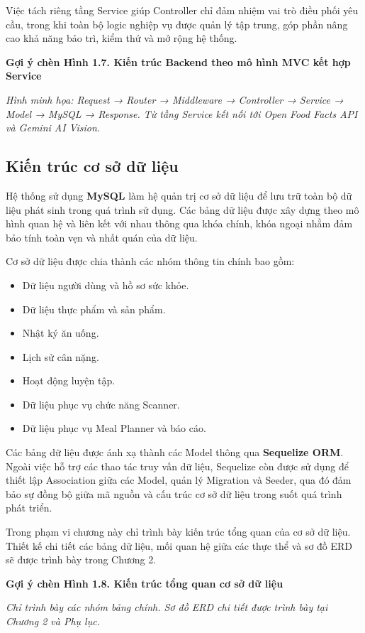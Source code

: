 \documentclass[12pt, a4paper]{report}
\begin{document}
Việc tách riêng tầng Service giúp Controller chỉ đảm nhiệm vai trò điều phối yêu cầu, trong khi toàn bộ logic nghiệp vụ được quản lý tập trung, góp phần nâng cao khả năng bảo trì, kiểm thử và mở rộng hệ thống.

\textbf{Gợi ý chèn Hình 1.7. Kiến trúc Backend theo mô hình MVC kết hợp Service}

\textit{Hình minh họa: Request → Router → Middleware → Controller → Service → Model → MySQL → Response. Từ tầng Service kết nối tới Open Food Facts API và Gemini AI Vision.}

\subsection{Kiến trúc cơ sở dữ liệu}Hệ thống sử dụng \textbf{MySQL} làm hệ quản trị cơ sở dữ liệu để lưu trữ toàn bộ dữ liệu phát sinh trong quá trình sử dụng. Các bảng dữ liệu được xây dựng theo mô hình quan hệ và liên kết với nhau thông qua khóa chính, khóa ngoại nhằm đảm bảo tính toàn vẹn và nhất quán của dữ liệu.

Cơ sở dữ liệu được chia thành các nhóm thông tin chính bao gồm:

\begin{itemize}
\item Dữ liệu người dùng và hồ sơ sức khỏe.
\item Dữ liệu thực phẩm và sản phẩm.
\item Nhật ký ăn uống.
\item Lịch sử cân nặng.
\item Hoạt động luyện tập.
\item Dữ liệu phục vụ chức năng Scanner.
\item Dữ liệu phục vụ Meal Planner và báo cáo.
\end{itemize}
Các bảng dữ liệu được ánh xạ thành các Model thông qua \textbf{Sequelize ORM}. Ngoài việc hỗ trợ các thao tác truy vấn dữ liệu, Sequelize còn được sử dụng để thiết lập Association giữa các Model, quản lý Migration và Seeder, qua đó đảm bảo sự đồng bộ giữa mã nguồn và cấu trúc cơ sở dữ liệu trong suốt quá trình phát triển.

Trong phạm vi chương này chỉ trình bày kiến trúc tổng quan của cơ sở dữ liệu. Thiết kế chi tiết các bảng dữ liệu, mối quan hệ giữa các thực thể và sơ đồ ERD sẽ được trình bày trong Chương 2.

\textbf{Gợi ý chèn Hình 1.8. Kiến trúc tổng quan cơ sở dữ liệu}

\textit{Chỉ trình bày các nhóm bảng chính. Sơ đồ ERD chi tiết được trình bày tại Chương 2 và Phụ lục.}
\end{document}
